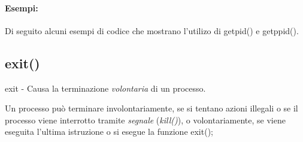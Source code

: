 \documentclass[../main.tex]{subfiles}
\begin{document}
\paragraph{Esempi:}
Di seguito alcuni esempi di codice che mostrano l'utilizo di getpid() e getppid().



\subsection{exit()}
exit - Causa la terminazione \textit{volontaria} di un processo.

Un processo può terminare involontariamente, se si tentano azioni illegali o se il processo viene interrotto tramite \textit{segnale} (\textit{kill()}), o volontariamente, se viene eseguita l'ultima istruzione o si esegue la funzione exit();
\end{document}
